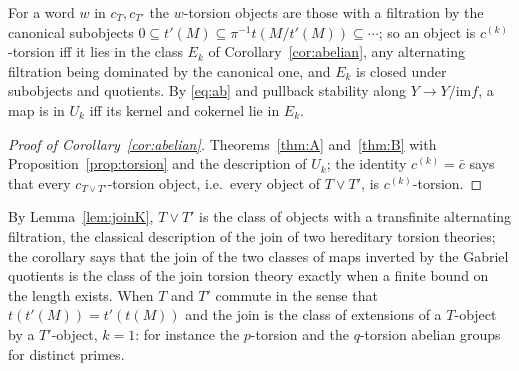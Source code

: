 \documentclass[11pt]{amsart}
\theoremstyle{definition}
\newcommand{\im}{\mathrm{im}}
\begin{document}
For a word $w$ in $c_T,c_{T'}$ the $w$-torsion objects are those with a
filtration by the canonical subobjects $0\subseteq t'(M)\subseteq
\pi^{-1}t(M/t'(M))\subseteq\cdots$; so an object is $c^{(k)}$-torsion iff it
lies in the class $E_k$ of Corollary~\ref{cor:abelian}, any alternating
filtration being dominated by the canonical one, and $E_k$ is closed under
subobjects and quotients. By \eqref{eq:ab} and pullback stability along
$Y\to Y/\im f$, a map is in $U_k$ iff its kernel and cokernel lie in $E_k$.

\begin{proof}[Proof of Corollary~\ref{cor:abelian}]
Theorems~\ref{thm:A} and~\ref{thm:B} with Proposition~\ref{prop:torsion}
and the description of $U_k$; the identity $c^{(k)}=\bar c$ says that every
$c_{T\vee T'}$-torsion object, i.e.\ every object of $T\vee T'$, is
$c^{(k)}$-torsion.
\end{proof}

By Lemma~\ref{lem:joinK}, $T\vee T'$ is the class of objects with a
transfinite alternating filtration, the classical description of the join
of two hereditary torsion theories; the corollary says that the join of
the two classes of maps inverted by the Gabriel quotients is the class of
the join torsion theory exactly when a finite bound on the length exists.
When $T$ and $T'$ commute in the sense that $t(t'(M))=t'(t(M))$ and the
join is the class of extensions of a $T$-object by a $T'$-object, $k=1$:
for instance the $p$-torsion and the $q$-torsion abelian groups for distinct
primes.
\end{document}

